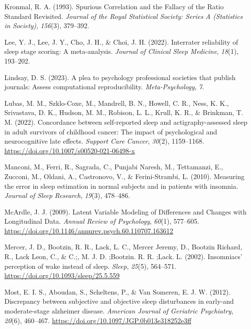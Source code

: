 \documentclass[
]{article}
\newlength{\cslhangindent}
\newenvironment{CSLReferences}[2] %
 {\begin{list}{}{%
  \setlength{\itemindent}{0pt}
  \setlength{\leftmargin}{0pt}
  \setlength{\parsep}{0pt}
  \ifodd #1
   \setlength{\leftmargin}{\cslhangindent}
   \setlength{\itemindent}{-1\cslhangindent}
  \fi
  \setlength{\itemsep}{#2\baselineskip}}}
 {\end{list}}
\begin{document}
\begin{CSLReferences}{1}{0}
Kronmal, R. A. (1993). {Spurious Correlation and the Fallacy of the Ratio Standard Revisited}. \emph{Journal of the Royal Statistical Society: Series A (Statistics in Society)}, \emph{156}(3), 379--392.

Lee, Y. J., Lee, J. Y., Cho, J. H., \& Choi, J. H. (2022). Interrater reliability of sleep stage scoring: A meta-analysis. \emph{Journal of Clinical Sleep Medicine}, \emph{18}(1), 193--202.

Lindsay, D. S. (2023). A plea to psychology professional societies that publish journals: Assess computational reproducibility. \emph{Meta-Psychology}, \emph{7}.

Lubas, M. M., Szklo-Coxe, M., Mandrell, B. N., Howell, C. R., Ness, K. K., Srivastava, D. K., Hudson, M. M., Robison, L. L., Krull, K. R., \& Brinkman, T. M. (2022). Concordance between self-reported sleep and actigraphy-assessed sleep in adult survivors of childhood cancer: The impact of psychological and neurocognitive late effects. \emph{Support Care Cancer}, \emph{30}(2), 1159--1168. \url{https://doi.org/10.1007/s00520-021-06498-x}

Manconi, M., Ferri, R., Sagrada, C., Punjabi Naresh, M., Tettamanzi, E., Zucconi, M., Oldani, A., Castronovo, V., \& Ferini-Strambi, L. (2010). {Measuring the error in sleep estimation in normal subjects and in patients with insomnia}. \emph{Journal of Sleep Research}, \emph{19}(3), 478--486.

McArdle, J. J. (2009). Latent {Variable} {Modeling} of {Differences} and {Changes} with {Longitudinal} {Data}. \emph{Annual Review of Psychology}, \emph{60}(1), 577--605. \url{https://doi.org/10.1146/annurev.psych.60.110707.163612}

Mercer, J. D., Bootzin, R. R., Lack, L. C., Mercer Jeremy, D., Bootzin Richard, R., Lack Leon, C., \& C.;, M. J. D. ;Bootzin. R. R. ;Lack. L. (2002). {Insomniacs' perception of wake instead of sleep}. \emph{Sleep}, \emph{25}(5), 564--571. \url{https://doi.org/10.1093/sleep/25.5.559}

Most, E. I. S., Aboudan, S., Scheltens, P., \& Van Someren, E. J. W. (2012). {Discrepancy between subjective and objective sleep disturbances in early-and moderate-stage alzheimer disease}. \emph{American Journal of Geriatric Psychiatry}, \emph{20}(6), 460--467. \url{https://doi.org/10.1097/JGP.0b013e318252e3ff}


\end{CSLReferences}
\end{document}
